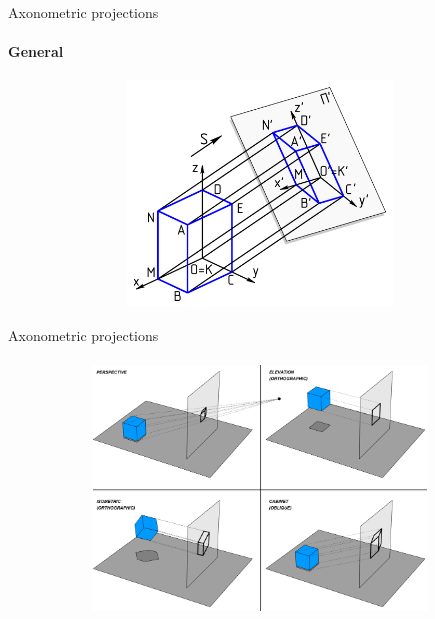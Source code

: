 \documentclass[aspectratio=169]{beamer}
\begin{document}
\begin{frame}[t]{Axonometric projections}
    \framesubtitle{General}
    \vspace{-0.6cm}
    \begin{figure}[H]
        \centering\includegraphics[height=6cm,width=1\textwidth,keepaspectratio]{resources/axono.png}
        \label{fig:resources/axono.png}
    \end{figure}
\end{frame}

\begin{frame}[t]{Axonometric projections}
    \framesubtitle{}
    \vspace{-0.6cm}
    \begin{figure}[H]
        \centering\includegraphics[height=6.5cm,width=1\textwidth,keepaspectratio]{resources/various_proj.png}
        \label{fig:resources/various_proj.png}
    \end{figure}
\end{frame}
\end{document}

